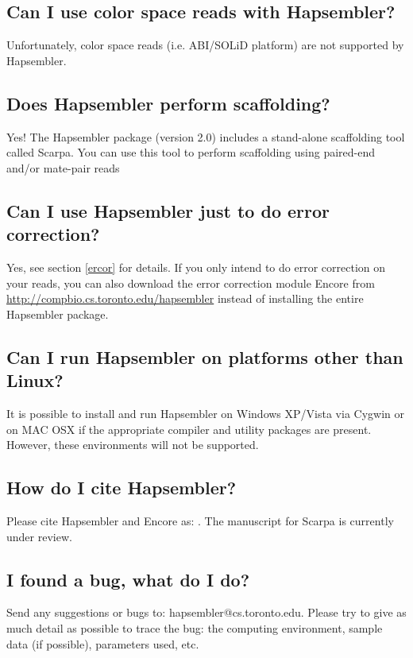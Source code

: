 \documentclass[12pt,a4paper]{report}
\begin{document}
\subsection{Can I use color space reads with Hapsembler?}

Unfortunately, color space reads (i.e. ABI/SOLiD platform) are not supported by Hapsembler.

\subsection{Does Hapsembler perform scaffolding?}

Yes! The Hapsembler package (version 2.0) includes a stand-alone scaffolding tool called Scarpa. You can use this tool to perform scaffolding using paired-end and/or mate-pair reads

\subsection{Can I use Hapsembler just to do error correction?}

Yes, see section \ref{ercor} for details. If you only intend to do error correction on your reads, you can also download the error correction module Encore from \url{http://compbio.cs.toronto.edu/hapsembler} instead of installing the entire Hapsembler package.

\subsection{Can I run Hapsembler on platforms other than Linux?}

It is possible to install and run Hapsembler on Windows XP/Vista via Cygwin or on MAC OSX if the appropriate compiler and utility packages are present. However, these environments will not be supported.

\subsection{How do I cite Hapsembler?}

Please cite Hapsembler and Encore as: \cite{donmez2}. The manuscript for Scarpa is currently under review.

\subsection{I found a bug, what do I do?}

Send any suggestions or bugs to: hapsembler@cs.toronto.edu. Please try to give as much detail as possible to trace the bug: the computing environment, sample data (if possible), parameters used, etc.



\end{document}
